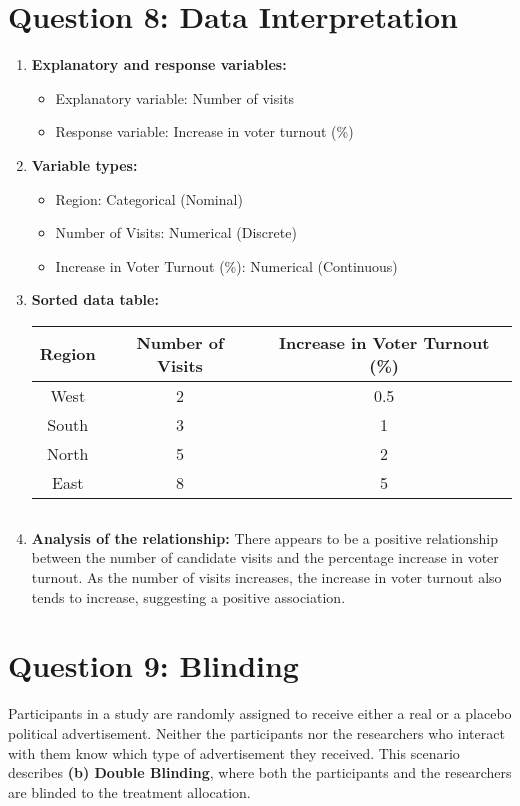 \documentclass{article}
\begin{document}
\section*{Question 8: Data Interpretation}
\begin{enumerate}
    \item \textbf{Explanatory and response variables:}
    \begin{itemize}
        \item Explanatory variable: Number of visits
        \item Response variable: Increase in voter turnout (\%)
    \end{itemize}
    \item \textbf{Variable types:}
    \begin{itemize}
        \item Region: Categorical (Nominal)
        \item Number of Visits: Numerical (Discrete)
        \item Increase in Voter Turnout (\%): Numerical (Continuous)
    \end{itemize}
    \item \textbf{Sorted data table:}

\begin{center}
    \begin{tabular}{|c|c|c|}
    \hline
    Region & Number of Visits & Increase in Voter Turnout (\%) \\
    \hline
West & 2 & 0.5 \\
South & 3 & 1 \\ 
North & 5 & 2 \\ 
East & 8 & 5 \\
    \hline
    \end{tabular}
\end{center}


    \begin{verbatim}

    \end{verbatim}
    \item \textbf{Analysis of the relationship:}
    There appears to be a positive relationship between the number of candidate visits and the percentage increase in voter turnout. As the number of visits increases, the increase in voter turnout also tends to increase, suggesting a positive association.
\end{enumerate}

\section*{Question 9: Blinding}
Participants in a study are randomly assigned to receive either a real or a placebo political advertisement. Neither the participants nor the researchers who interact with them know which type of advertisement they received. This scenario describes \textbf{(b) Double Blinding}, where both the participants and the researchers are blinded to the treatment allocation.
\end{document}

